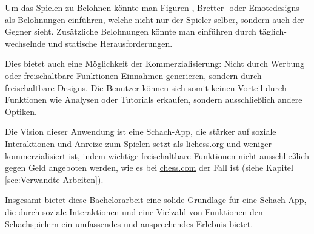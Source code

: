 Um das Spielen zu Belohnen könnte man Figuren-, Bretter- oder Emotedesigns als Belohnungen einführen, welche nicht nur der Spieler selber, sondern auch der Gegner sieht. Zusätzliche Belohnungen könnte man einführen durch täglich-wechselnde und statische Herausforderungen.

Dies bietet auch eine Möglichkeit der Kommerzialisierung: Nicht durch Werbung oder freischaltbare Funktionen Einnahmen generieren, sondern durch freischaltbare Designs. Die Benutzer können sich somit keinen Vorteil durch Funktionen wie Analysen oder Tutorials erkaufen, sondern ausschließlich andere Optiken.

Die Vision dieser Anwendung ist eine Schach-App, die stärker auf soziale Interaktionen und Anreize zum Spielen setzt als \url{lichess.org} und weniger kommerzialisiert ist, indem wichtige freischaltbare Funktionen nicht ausschließlich gegen Geld angeboten werden, wie es bei \url{chess.com} der Fall ist (siehe Kapitel \ref{sec:Verwandte Arbeiten}).

Insgesamt bietet diese Bachelorarbeit eine solide Grundlage für eine Schach-App, die durch soziale Interaktionen und eine Vielzahl von Funktionen den Schachspielern ein umfassendes und ansprechendes Erlebnis bietet.